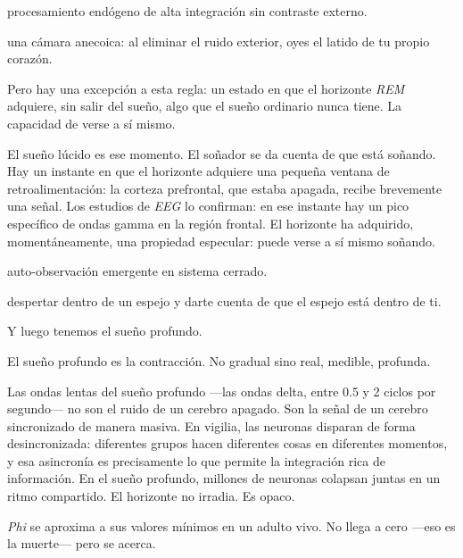 \begin{fisica}
 procesamiento endógeno de alta integración sin contraste externo.

 una cámara anecoica: al eliminar el ruido exterior, oyes el latido de tu propio corazón.
\end{fisica}
\noindent Pero hay una excepción a esta regla: un estado en que el horizonte \emph{REM} adquiere, sin salir del sueño, algo que el sueño ordinario nunca tiene. La capacidad de verse a sí mismo.

El sueño lúcido es ese momento. El soñador se da cuenta de que está soñando. Hay un instante en que el horizonte adquiere una pequeña ventana de retroalimentación: la corteza prefrontal, que estaba apagada, recibe brevemente una señal. Los estudios de \emph{EEG} lo confirman: en ese instante hay un pico específico de ondas gamma en la región frontal. El horizonte ha adquirido, momentáneamente, una propiedad especular: puede verse a sí mismo soñando.

\begin{fisica}
 auto-observación emergente en sistema cerrado.

 despertar dentro de un espejo y darte cuenta de que el espejo está dentro de ti.
\end{fisica}
\noindent Y luego tenemos el sueño profundo.

El sueño profundo es la contracción. No gradual sino real, medible, profunda.

Las ondas lentas del sueño profundo —las ondas delta, entre 0.5 y 2 ciclos por segundo— no son el ruido de un cerebro apagado. Son la señal de un cerebro sincronizado de manera masiva. En vigilia, las neuronas disparan de forma desincronizada: diferentes grupos hacen diferentes cosas en diferentes momentos, y esa asincronía es precisamente lo que permite la integración rica de información. En el sueño profundo, millones de neuronas colapsan juntas en un ritmo compartido. El horizonte no irradia. Es opaco.

\emph{Phi} se aproxima a sus valores mínimos en un adulto vivo. No llega a cero —eso es la muerte— pero se acerca.

